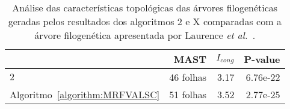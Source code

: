 \begin{table}[!htb]
  \caption{Análise das características topológicas das árvores filogenéticas geradas pelos resultados dos algoritmos $2$\SbRT{} e X comparadas com a árvore filogenética apresentada por Laurence \textit {et al.}~\cite{garczarek2020cyanorak}.\label{table:NRAGLYCG}}
  \centering
  \begin{tabular}{|l|r|r|r|}
  \hline
                                     &                    MAST &              $I_{cong}$ &                 P-value \\ \hline
  $2$\SbRT{}                         &               46 folhas &                    3.17 &                6.76e-22 \\ \hline
  Algoritmo~\ref{algorithm:MRFVALSC} &               51 folhas &                    3.52 &                2.77e-25 \\ \hline
  \end{tabular}
\end{table}